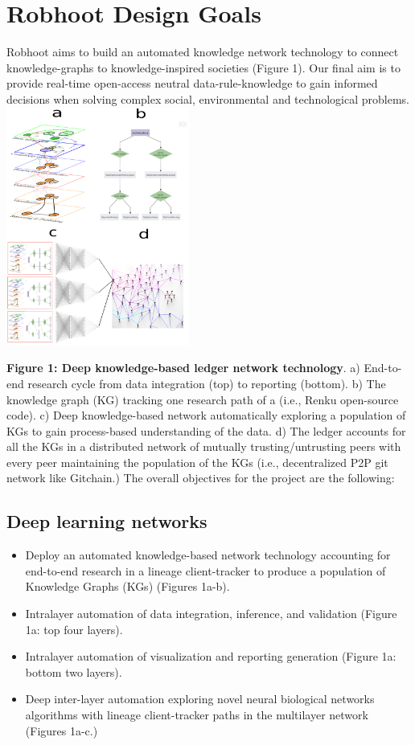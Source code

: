\documentclass[10pt, a4paper, twocolumn]{article} %
\begin{document}
  \section{Robhoot Design Goals}
  Robhoot aims to build an automated knowledge network technology to
  connect knowledge-graphs to knowledge-inspired societies (Figure
  1). Our final aim is to provide real-time open-access neutral
  data-rule-knowledge to gain informed decisions when solving complex
  social, environmental and technological problems.
  \includegraphics[width=0.45\textwidth]{Figure1.pdf}
  
  {\small {\bf Figure 1: Deep knowledge-based ledger network
      technology}. a) End-to-end research cycle from data integration
    (top) to reporting (bottom). b) The knowledge graph (KG) tracking
    one research path of a (i.e., Renku open-source code). c) Deep
    knowledge-based network automatically exploring a population of
    KGs to gain process-based understanding of the data. d) The ledger
    accounts for all the KGs in a distributed network of mutually
    trusting/untrusting peers with every peer maintaining the
    population of the KGs (i.e., decentralized P2P git network like
    Gitchain.)}  The overall objectives for the project are the
  following:
  \subsection{Deep learning networks}
  \begin{itemize}
  \item Deploy an automated knowledge-based network technology
    accounting for end-to-end research in a lineage client-tracker to
    produce a population of Knowledge Graphs (KGs) (Figures 1a-b).
  \item Intralayer automation of data integration, inference, and
    validation (Figure 1a: top four layers).
  \item Intralayer automation of visualization and reporting
    generation (Figure 1a: bottom two layers).
  \item Deep inter-layer automation exploring novel neural biological
    networks algorithms with lineage client-tracker paths in the
    multilayer network (Figures 1a-c.)
  \end{itemize}
\end{document}
